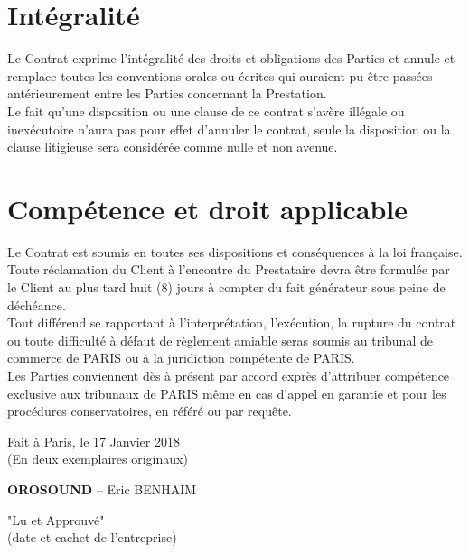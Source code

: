 \documentclass[8pt,french]{base}
\begin{document}
\begin{multicols*}{3}
\section{Intégralité}

Le Contrat exprime l’intégralité des droits et obligations des Parties et annule et remplace toutes les conventions orales ou écrites qui auraient pu être passées antérieurement entre les Parties concernant la Prestation. \\
Le fait qu’une disposition ou une clause de ce contrat s’avère illégale ou inexécutoire n’aura pas pour effet d’annuler le contrat, seule la disposition ou la clause litigieuse sera considérée comme nulle et non avenue.

\section{Compétence et droit applicable}

Le Contrat est soumis en toutes ses dispositions et conséquences à la loi française. \\
Toute réclamation du Client à l’encontre du Prestataire devra être formulée par le Client au plus tard huit (8) jours à compter du fait générateur sous peine de déchéance. \\
Tout différend se rapportant à l’interprétation, l’exécution, la rupture du contrat ou toute difficulté à défaut de règlement amiable seras soumis au tribunal de commerce de PARIS ou à la juridiction compétente de PARIS. \\
Les Parties conviennent dès à présent par accord exprès d’attribuer compétence exclusive aux tribunaux de PARIS même en cas d’appel en garantie et pour les procédures conservatoires, en référé ou par requête.

\vspace{3em}

\noindent
Fait à Paris, le 17 Janvier 2018\\
(En deux exemplaires originaux)\\
\par
\noindent
\textbf{OROSOUND} – Eric BENHAIM \par
{\small "Lu et Approuvé" \\
(date et cachet de l'entreprise)}

\end{multicols*}
\end{document}
